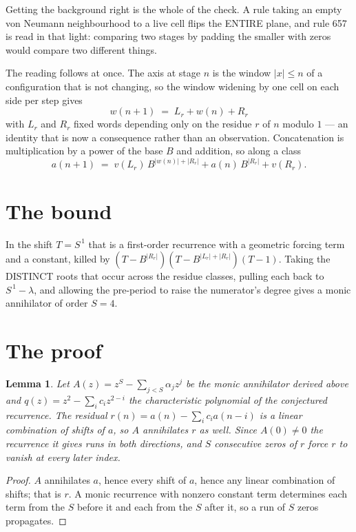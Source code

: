 \documentclass[11pt,a4paper]{article}
\theoremstyle{plain}
\newtheorem{lemma}[theorem]{Lemma}
\theoremstyle{definition}
\begin{document}
Getting the background right is the whole of the check. A rule taking an empty von Neumann
neighbourhood to a live cell flips the ENTIRE plane, and rule 657 is read
in that light: comparing two stages by padding the smaller with zeros would compare two
different things.

The reading follows at once. The axis at stage $n$ is the window $|x|\le n$ of a configuration
that is not changing, so the window widening by one cell on each side per step gives
\[
w(n+1)\;=\;L_r + w(n) + R_r
\]
with $L_r$ and $R_r$ fixed words depending only on the residue $r$ of $n$ modulo $1$ --- an
identity that is now a consequence rather than an observation. Concatenation is multiplication
by a power of the base $B$ and addition, so along a class
\[
a(n+1)\;=\;v(L_r)\,B^{|w(n)|+|R_r|} + a(n)\,B^{|R_r|} + v(R_r).
\]

\section{The bound}

In the shift $T=S^{\,1}$ that is a first-order recurrence with a geometric forcing term and a
constant, killed by $(T-B^{|R_r|})(T-B^{|L_r|+|R_r|})(T-1)$. Taking the DISTINCT roots that
occur across the residue classes, pulling each back to $S^{\,1}-\lambda$, and allowing the
pre-period to raise the numerator's degree gives a monic annihilator of order $S=4$.

\section{The proof}

\begin{lemma}\label{lem:crit}
Let $A(z)=z^S-\sum_{j<S}\alpha_jz^{j}$ be the monic annihilator derived above and
$q(z)=z^{2}-\sum_ic_iz^{2-i}$ the characteristic polynomial of the conjectured
recurrence. The residual $r(n)=a(n)-\sum_ic_ia(n-i)$ is a linear combination of shifts of $a$,
so $A$ annihilates $r$ as well. Since $A(0)\ne0$ the recurrence it gives runs in both
directions, and $S$ consecutive zeros of $r$ force $r$ to vanish at every later index.
\end{lemma}

\begin{proof}
$A$ annihilates $a$, hence every shift of $a$, hence any linear combination of shifts; that is
$r$. A monic recurrence with nonzero constant term determines each term from the $S$ before it
and each from the $S$ after it, so a run of $S$ zeros propagates.
\end{proof}
\end{document}
